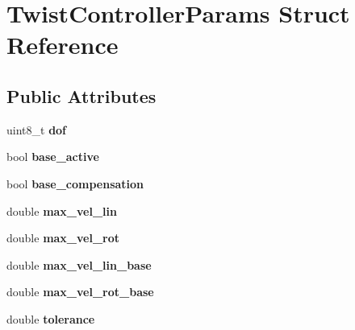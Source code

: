\hypertarget{structTwistControllerParams}{\section{Twist\-Controller\-Params Struct Reference}
\label{structTwistControllerParams}
}
\subsection*{Public Attributes}
\begin{DoxyCompactItemize}
\item 
\hypertarget{structTwistControllerParams_a69524f6ddafd01ee5b5622aaedf4a255}{uint8\-\_\-t {\bfseries dof}}\label{structTwistControllerParams_a69524f6ddafd01ee5b5622aaedf4a255}

\item 
\hypertarget{structTwistControllerParams_a76a09cf3f2fcaa612a318ddb68d06a89}{bool {\bfseries base\-\_\-active}}\label{structTwistControllerParams_a76a09cf3f2fcaa612a318ddb68d06a89}

\item 
\hypertarget{structTwistControllerParams_ab1f7484bf017d7c6c0be8ca97b6a90fc}{bool {\bfseries base\-\_\-compensation}}\label{structTwistControllerParams_ab1f7484bf017d7c6c0be8ca97b6a90fc}

\item 
\hypertarget{structTwistControllerParams_a01732686f0558b9ff1bb233d4272b3f1}{double {\bfseries max\-\_\-vel\-\_\-lin}}\label{structTwistControllerParams_a01732686f0558b9ff1bb233d4272b3f1}

\item 
\hypertarget{structTwistControllerParams_af4a0c5a8a8b9061952de82b1cc2745f8}{double {\bfseries max\-\_\-vel\-\_\-rot}}\label{structTwistControllerParams_af4a0c5a8a8b9061952de82b1cc2745f8}

\item 
\hypertarget{structTwistControllerParams_ac7f0079a39420df534f75cbdfb111659}{double {\bfseries max\-\_\-vel\-\_\-lin\-\_\-base}}\label{structTwistControllerParams_ac7f0079a39420df534f75cbdfb111659}

\item 
\hypertarget{structTwistControllerParams_a258564a070a6d212ce627ffc735e3e3b}{double {\bfseries max\-\_\-vel\-\_\-rot\-\_\-base}}\label{structTwistControllerParams_a258564a070a6d212ce627ffc735e3e3b}

\item 
\hypertarget{structTwistControllerParams_a625ee1a3f8f44b72bd08a940ba079560}{double {\bfseries tolerance}}\label{structTwistControllerParams_a625ee1a3f8f44b72bd08a940ba079560}


\end{DoxyCompactItemize}
